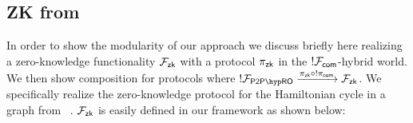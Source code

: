

\subsection{ZK from \Fcom}
In order to show the modularity of our approach we discuss briefly here realizing a zero-knowledge functionality $\mathcal{F}_{{\mathsf {zk}}}$ with a protocol $\pi_{{\mathsf {zk}}}$ in the $!\mathcal{F}_{{\mathsf {com}}}$-hybrid world.
We then show composition for protocols where $!\Fropp \xrightarrow{\pi_\msf{zk} \circ !\pi_\msf{com}} \F_\msf{zk}$.
We specifically realize the zero-knowledge protocol for the Hamiltonian cycle in a graph from ~\cite{uccommitments}.
$\mathcal{F}_{{\mathsf {zk}}}$ is easily defined in our framework as shown below:

